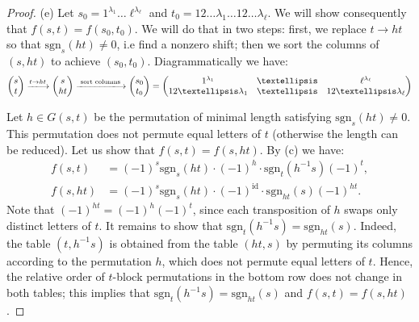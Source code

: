 \documentclass[10pt,a4paper]{amsart}
\newcommand{\sgn}{\mathrm{sgn}}
\begin{document}
\begin{proof}
    \vspace{0.5em}

    (e) Let $s_0 = 1^{\lambda_1}\ldots \ell^{\lambda_\ell}$ and $t_0 = 12\ldots\lambda_1\ldots12\ldots\lambda_\ell$. 
    We will show consequently that $f(s,t) = f(s_0, t_0)$. We will do that in two steps: first, we replace $t \to ht$ so that $\sgn_s(ht) \neq 0$, i.e find a nonzero shift; then we sort the columns of $(s,ht)$ to achieve $(s_0, t_0)$. Diagrammatically we have:
    $$
        \begin{pmatrix}
            s\\
            t
        \end{pmatrix} 
        \xlongrightarrow{t \to ht}
        \begin{pmatrix}
            s\\
            ht
        \end{pmatrix} 
        \xlongrightarrow{\text{ sort columns }}
        \begin{pmatrix}
            s_0\\
            t_0
        \end{pmatrix} = 
        \begin{pmatrix}
            1^{\lambda_1}& \ldots & \ell^{\lambda_\ell}\\
            12\ldots\lambda_1&\ldots& 12\ldots\lambda_\ell
        \end{pmatrix}
    $$
    
    Let $h \in G(s,t)$ be the permutation of minimal length satisfying $\sgn_s(ht) \neq 0$. This permutation does not permute equal letters of $t$ (otherwise the length can be reduced). %
    Let us show that $f(s,t) = f(s, ht)$. By (c) we have:
    \begin{align*}
        f(s,t) &= (-1)^s\sgn_s(ht) \cdot (-1)^h \cdot \sgn_t(h^{-1} s) (-1)^t,\\ 
        f(s,ht) &= (-1)^s \sgn_s(ht) \cdot (-1)^{\mathrm{id}} \cdot \sgn_{ht}(s) (-1)^{ht}.
    \end{align*}
    Note that $(-1)^{ht} = (-1)^h (-1)^t$, since each transposition of $h$ swaps only distinct letters of $t$. It remains to show that $\sgn_t(h^{-1} s) = \sgn_{ht}(s)$. Indeed, the table $(t, h^{-1}s)$ is obtained from the table $(ht, s)$ by permuting its columns according to the permutation $h$, which does not permute equal letters of $t$. Hence, the relative order %
    of $t$-block permutations in the bottom row does not change in both tables; this implies that $\sgn_t(h^{-1} s) = \sgn_{ht}(s)$ and $f(s,t) = f(s,ht)$.


\end{proof}
\end{document}
